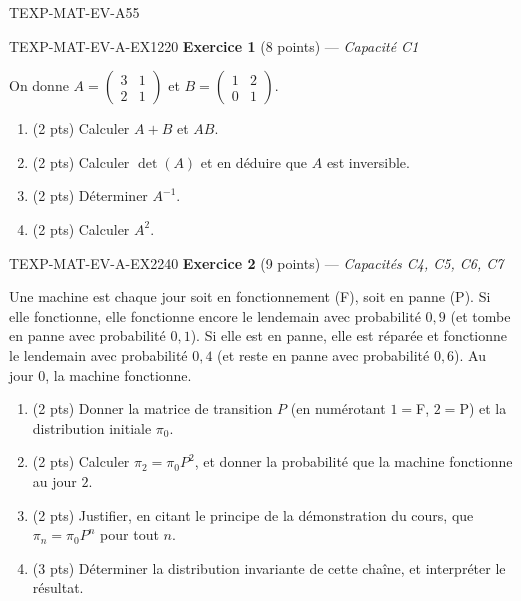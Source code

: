 \begin{evaluation}{TEXP-MAT-EV-A}{55}

\begin{exercice}{TEXP-MAT-EV-A-EX1}{2}{20}
\textbf{Exercice 1} (8 points) --- \textit{Capacité C1}

\medskip

On donne $A=\begin{pmatrix}3&1\\2&1\end{pmatrix}$ et $B=\begin{pmatrix}1&2\\0&1\end{pmatrix}$.

\begin{enumerate}
  \item (2 pts) Calculer $A+B$ et $AB$.
  \item (2 pts) Calculer $\det(A)$ et en déduire que $A$ est inversible.
  \item (2 pts) Déterminer $A^{-1}$.
  \item (2 pts) Calculer $A^2$.
\end{enumerate}
\end{exercice}

\begin{exercice}{TEXP-MAT-EV-A-EX2}{2}{40}
\textbf{Exercice 2} (9 points) --- \textit{Capacités C4, C5, C6, C7}

\medskip

Une machine est chaque jour soit en fonctionnement (F), soit en panne (P). Si elle fonctionne, elle fonctionne encore le lendemain avec probabilité $0{,}9$ (et tombe en panne avec probabilité $0{,}1$). Si elle est en panne, elle est réparée et fonctionne le lendemain avec probabilité $0{,}4$ (et reste en panne avec probabilité $0{,}6$). Au jour $0$, la machine fonctionne.

\begin{enumerate}
  \item (2 pts) Donner la matrice de transition $P$ (en numérotant $1=$F, $2=$P) et la distribution initiale $\pi_0$.
  \item (2 pts) Calculer $\pi_2=\pi_0P^2$, et donner la probabilité que la machine fonctionne au jour $2$.
  \item (2 pts) Justifier, en citant le principe de la démonstration du cours, que $\pi_n=\pi_0P^n$ pour tout $n$.
  \item (3 pts) Déterminer la distribution invariante de cette chaîne, et interpréter le résultat.
\end{enumerate}
\end{exercice}


\end{evaluation}
